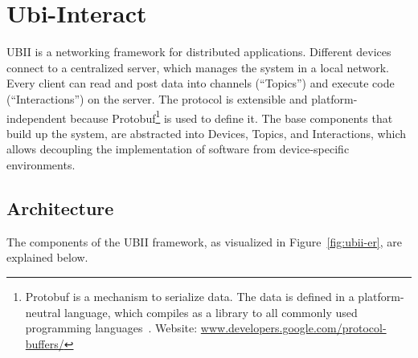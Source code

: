 \section{Ubi-Interact}\label{section:ubi-interact}

\acf{UBII} is a networking framework for distributed applications. Different devices connect to a centralized server, which manages the system in a local network. Every client can read and post data into channels (\enquote{Topics}) and execute code (\enquote{Interactions}) on the server. The protocol is extensible and platform-independent because \acf{Protobuf}\footnote{Protobuf is a mechanism to serialize data. The data is defined in a platform-neutral language, which compiles as a library to all commonly used programming languages~\cite{GoogleLLC.2019b}. Website: \href{https://developers.google.com/protocol-buffers/}{www.developers.google.com/protocol-buffers/}} is used to define it. The base components that build up the system, are abstracted into Devices, Topics, and Interactions, which allows decoupling the implementation of software from device-specific environments.


\subsection{Architecture}\label{subsection:architecture}

The components of the \ac{UBII} framework, as visualized in Figure~\ref{fig:ubii-er}, are explained below.

